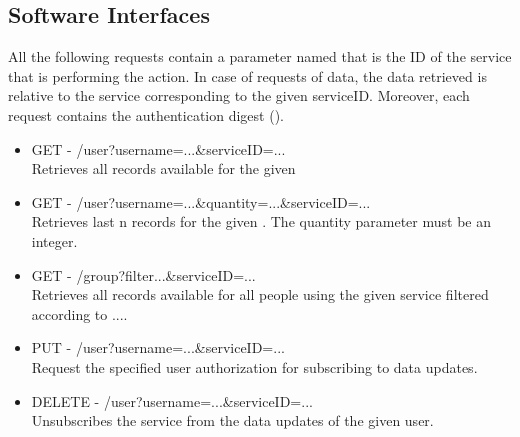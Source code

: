 \documentclass[../../../rasd.tex]{subfiles}
\begin{document}
\subsection{Software Interfaces}
			All the following requests contain a parameter named  that is the ID of the service that is performing the action. In case of requests of data, the data retrieved is relative to the service corresponding to the given serviceID.
			Moreover, each request contains the authentication digest ().
			\begin{itemize}
				\item GET - /user?username=...\&serviceID=... \\
				Retrieves all records available for the given 
				\item GET - /user?username=...\&quantity=...\&serviceID=... \\
				Retrieves last n records for the given . The quantity parameter must be an integer.
				\item GET - /group?filter...\&serviceID=... \\
				Retrieves all records available for all people using the given service filtered according to ....\\ 
				\item PUT - /user?username=...\&serviceID=... \\
				Request the specified user authorization for subscribing to data updates.
				\item DELETE - /user?username=...\&serviceID=... \\
				Unsubscribes the service from the data updates of the given user.
			\end{itemize}
\end{document}
